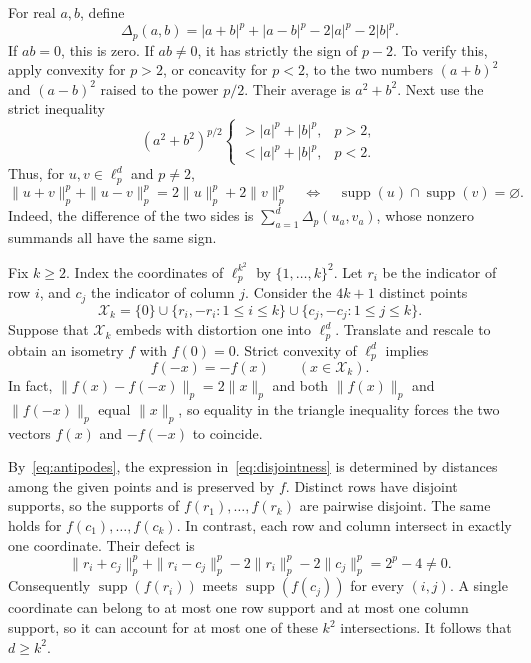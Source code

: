 \documentclass[11pt]{article}
\theoremstyle{remark}
\numberwithin{equation}{section}
\begin{document}
For real $a,b$, define
\[
 \Delta_p(a,b)=|a+b|^p+|a-b|^p-2|a|^p-2|b|^p.
\]
If $ab=0$, this is zero. If $ab\ne0$, it has strictly the sign of
$p-2$. To verify this, apply convexity for $p>2$, or concavity for
$p<2$, to the two numbers $(a+b)^2$ and $(a-b)^2$ raised to the power
$p/2$. Their average is $a^2+b^2$. Next use the strict inequality
\[
 (a^2+b^2)^{p/2}
 \begin{cases}
  >|a|^p+|b|^p,&p>2,\\
  <|a|^p+|b|^p,&p<2.
 \end{cases}
\]
Thus, for $u,v\in\ell_p^d$ and $p\ne2$,
\begin{equation}\label{eq:disjointness}
 \|u+v\|_p^p+\|u-v\|_p^p
 =2\|u\|_p^p+2\|v\|_p^p
 \quad\Longleftrightarrow\quad
 \operatorname{supp}(u)\cap\operatorname{supp}(v)=\varnothing.
\end{equation}
Indeed, the difference of the two sides is
$\sum_{a=1}^d\Delta_p(u_a,v_a)$, whose nonzero summands all have the
same sign.

Fix $k\ge2$. Index the coordinates of $\ell_p^{k^2}$ by
$\{1,\ldots,k\}^2$. Let $r_i$ be the indicator of row $i$, and $c_j$
the indicator of column $j$. Consider the $4k+1$ distinct points
\[
 \mathcal X_k=\{0\}\cup\{r_i,-r_i:1\le i\le k\}
                    \cup\{c_j,-c_j:1\le j\le k\}.
\]
Suppose that $\mathcal X_k$ embeds with distortion one into
$\ell_p^d$. Translate and rescale to obtain an isometry $f$ with
$f(0)=0$. Strict convexity of $\ell_p^d$ implies
\begin{equation}\label{eq:antipodes}
 f(-x)=-f(x)\qquad(x\in\mathcal X_k).
\end{equation}
In fact, $\|f(x)-f(-x)\|_p=2\|x\|_p$ and both $\|f(x)\|_p$ and
$\|f(-x)\|_p$ equal $\|x\|_p$, so equality in the triangle inequality
forces the two vectors $f(x)$ and $-f(-x)$ to coincide.

By~\eqref{eq:antipodes}, the expression in~\eqref{eq:disjointness}
is determined by distances among the given points and is preserved
by $f$. Distinct rows have disjoint supports, so the supports of
$f(r_1),\ldots,f(r_k)$ are pairwise disjoint. The same holds for
$f(c_1),\ldots,f(c_k)$. In contrast, each row and column intersect
in exactly one coordinate. Their defect is
\[
 \|r_i+c_j\|_p^p+\|r_i-c_j\|_p^p
 -2\|r_i\|_p^p-2\|c_j\|_p^p=2^p-4\ne0.
\]
Consequently $\operatorname{supp}(f(r_i))$ meets
$\operatorname{supp}(f(c_j))$ for every $(i,j)$. A single coordinate
can belong to at most one row support and at most one column support,
so it can account for at most one of these $k^2$ intersections.
It follows that $d\ge k^2$.
\end{document}
